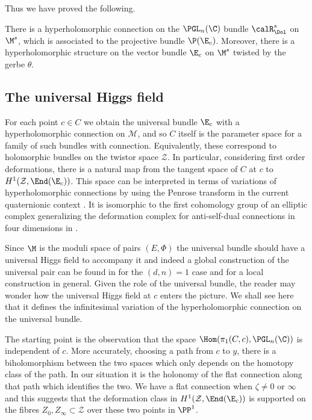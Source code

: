 Thus we have proved the following.

\begin{theorem}
\notready There is a hyperholomorphic connection on the $\PGL_n(\C)$ bundle $\calR^s_\Dol$ on $\M^s$, which is associated to the projective bundle $\P(\E_c)$. Moreover, there is a hyperholomorphic structure on the  vector bundle $\E_c$ on $\M^s$ twisted by the gerbe  $\theta$.
\end{theorem}

\subsection{The universal Higgs field}
For each point $c\in C$ we obtain the universal bundle $\E_c$ with a hyperholomorphic connection on ${\mathcal M}$, and so $C$ itself is the parameter space for  a family of such bundles with connection.  Equivalently, these correspond to holomorphic bundles on the twistor space ${\mathcal Z}$. In particular, considering first order deformations, there is a natural map from the tangent space of $C$ at $c$ to $H^1({\mathcal Z},\End (\E_c))$. This space can be interpreted  in terms of variations of hyperholomorphic connections  by using the Penrose transform in the current quaternionic context \cite{Sal}. It is isomorphic to the first cohomology group of an elliptic complex generalizing  the deformation complex for anti-self-dual connections in four dimensions in \cite{AHS}.

Since $\M$ is the moduli space of pairs $(E,\Phi)$ the universal bundle should have a universal Higgs field to accompany it and indeed a global construction of the universal pair  can be found in  \cite{hausel-vanishing} for the $(d,n)=1$ case
and  \cite[Theorem 4.5]{simpson1}  for a local construction in general.
Given the role of the universal bundle, the reader may wonder how the universal Higgs field at $c$ enters the picture. We shall see here that it defines the infinitesimal variation of the hyperholomorphic connection on the universal bundle.


The starting point is the observation that the space $\Hom(\pi_1(C,c), \PGL_n(\C))$ is independent of $c$. More accurately, choosing a path from $c$ to $y$, there is a biholomorphism between the two spaces which only depends on the homotopy class of the path. In our situation it is the holonomy of the flat connection along that path which identifies the two. We have a flat connection when $\zeta \ne 0$ or $\infty$ and this suggests that the deformation class in $H^1({\mathcal Z},\End (\E_c))$ is supported on the fibres $Z_0,Z_{\infty}\subset {\mathcal Z}$ over these two points in $\PP^1$.

